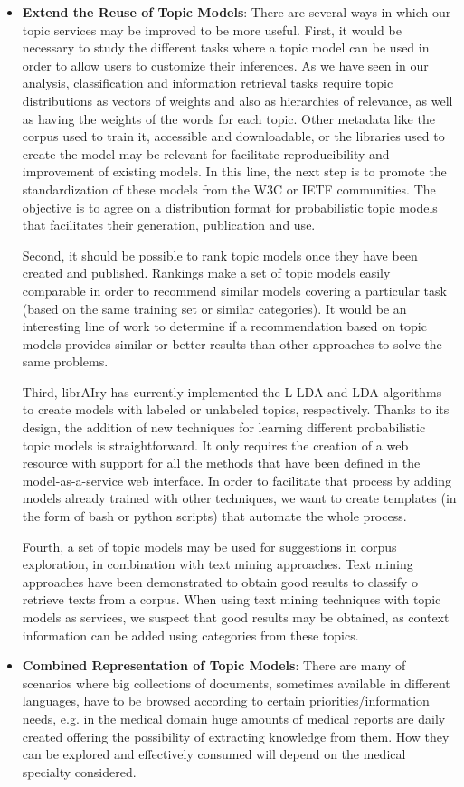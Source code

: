 \begin{itemize}
\item \textbf{Extend the Reuse of Topic Models}: There are several ways in which our topic services may be improved to be more useful. First, it would be necessary to study the different tasks where a topic model can be used in order to allow users to customize their inferences. As we have seen in our analysis, classification and information retrieval tasks require topic distributions as vectors of weights and also as hierarchies of relevance, as well as having the weights of the words for each topic. Other metadata like the corpus used to train it, accessible and downloadable, or the libraries used to create the model may be relevant for facilitate reproducibility and improvement of existing models. In this line, the next step is to promote the standardization of these models from the W3C or IETF communities. The objective is to agree on a distribution format for probabilistic topic models that facilitates their generation, publication and use.

Second, it should be possible to rank topic models once they have been created and published. Rankings make a set of topic models easily comparable in order to recommend similar models covering a particular task (based on the same training set or similar categories). It would be an interesting line of work to determine if a recommendation based on topic models provides similar or better results than other approaches to solve the same problems.

Third, librAIry has currently implemented the L-LDA and LDA algorithms to create models with labeled or unlabeled topics, respectively. Thanks to its design, the addition of new techniques for learning different probabilistic topic models is straightforward. It only requires the creation of a web resource with support for all the methods that have been defined in the model-as-a-service web interface. In order to facilitate that process by adding models already trained with other techniques, we want to create templates (in the form of bash or python scripts) that automate the whole process.

Fourth, a set of topic models may be used for suggestions in corpus exploration, in combination with text mining approaches. Text mining approaches have been demonstrated to obtain good results to classify o retrieve texts from a corpus. When using text mining techniques with topic models as services, we suspect that good results may be obtained, as context information can be added using categories from these topics. 
\item \textbf{Combined Representation of Topic Models}: There are many of scenarios where big collections of documents, sometimes available in different languages, have to be browsed according to certain priorities/information needs, e.g. in the medical domain huge amounts of medical reports are daily created offering the possibility of extracting knowledge from them. How they can be explored and effectively consumed will depend on the medical specialty considered. 


\end{itemize}
